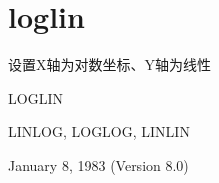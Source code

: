 \section{loglin}
\label{cmd:loglin}

设置X轴为对数坐标、Y轴为线性

LOGLIN

LINLOG, LOGLOG, LINLIN

January 8, 1983 (Version 8.0)
